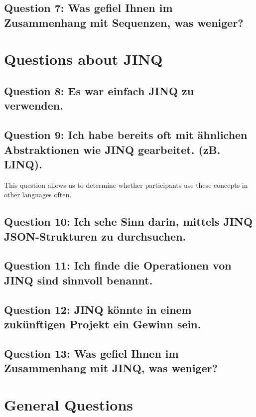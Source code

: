 \subsection{Question 7: Was gefiel Ihnen im Zusammenhang mit Sequenzen, was weniger? }
\label{sub:ut_q7}
\section{Questions about JINQ} %
\label{sec:Questions about JINQ}

\subsection{Question 8: Es war einfach JINQ zu verwenden. }
\label{sub:ut_q8}
\subsection{Question 9: Ich habe bereits oft mit ähnlichen Abstraktionen wie
JINQ gearbeitet. (zB. LINQ).}
This question allows us to determine whether participants use these concepts in
other languages often.
\label{sub:ut_q9}
\subsection{Question 10: Ich sehe Sinn darin, mittels JINQ JSON-Strukturen zu durchsuchen. }
\label{sub:ut_q10}
\subsection{Question 11: Ich finde die Operationen von JINQ sind sinnvoll benannt. }
\label{sub:ut_q11}
\subsection{Question 12: JINQ könnte in einem zukünftigen Projekt ein Gewinn sein. }
\label{sub:ut_q12}
\subsection{Question 13: Was gefiel Ihnen im Zusammenhang mit JINQ, was weniger? }
\label{sub:ut_q13}

\section{General Questions} %
\label{sec:General Questions}

